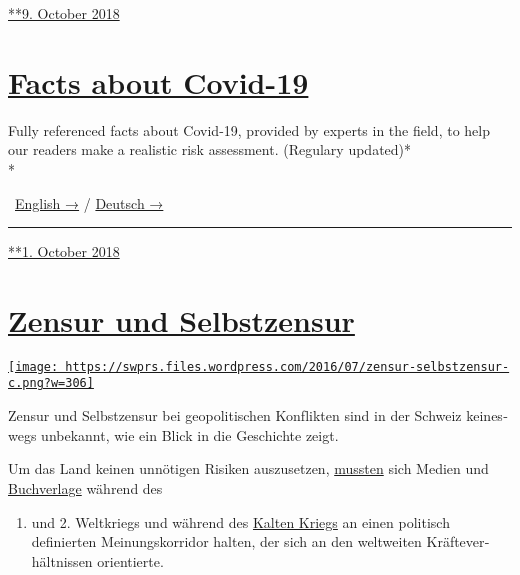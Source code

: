 \href{https://swprs.org/2018/10/09/willkommen/}{**9. October 2018}

\hypertarget{facts-about-covid-19}{%
\section{\texorpdfstring{\href{https://swprs.org/2018/10/01/covid-19-hinweis-ii/}{Facts
about Covid-19}}{Facts about Covid-19}}\label{facts-about-covid-19}}

Fully referenced facts about Covid-19, provided by experts in the field,
to help our readers make a realistic risk assessment. (Regulary
updated)*\\
*

~\href{https://swprs.org/a-swiss-doctor-on-covid-19/}{English →} /
\href{https://swprs.org/covid-19-hinweis-ii/}{Deutsch →}

\begin{center}\rule{0.5\linewidth}{\linethickness}\end{center}

\href{https://swprs.org/2018/10/01/covid-19-hinweis-ii/}{**1. October
2018}

\hypertarget{zensur-und-selbstzensur}{%
\section{\texorpdfstring{\href{https://swprs.org/2017/03/01/zensur-in-schweizer-medien/}{Zensur
und
Selbstzensur}}{Zensur und Selbstzensur}}\label{zensur-und-selbstzensur}}

\href{https://swprs.org/2017/03/01/zensur-in-schweizer-medien/}{\texttt{[image: https://swprs.files.wordpress.com/2016/07/zensur-selbstzensur-c.png?w=306]}}

Zensur und Selbst­zensur bei geo­po­li­tischen Kon­f‌lik­ten sind in der
Schweiz keines­wegs un­be­kannt, wie ein Blick in die Ge­schichte zeigt.

Um das Land keinen un­nöti­gen Ri­si­ken aus­zu­setzen,
\href{http://www.amazon.de/Selbstzensur-schweizerische-Pressepolitik-Zweiten-Weltkrieg/dp/3719304566}{muss­ten}
sich Medien und
\href{https://www.chronos-verlag.ch/node/20528}{Buch­ver­lage} wäh­rend
des

\begin{enumerate}
\def\labelenumi{\arabic{enumi}.}
\tightlist
\item
  und 2. Welt­kriegs und während des
  \href{http://www.swissinfo.ch/ger/das-ende-eines-nationalen-maenner-netzwerks/4205194}{Kal­ten
  Kriegs} an einen po­li­tisch definierten Mei­nungs­korri­dor halten,
  der sich an den welt­wei­ten Kräfte­ver­hält­nissen orientierte.
\end{enumerate}


